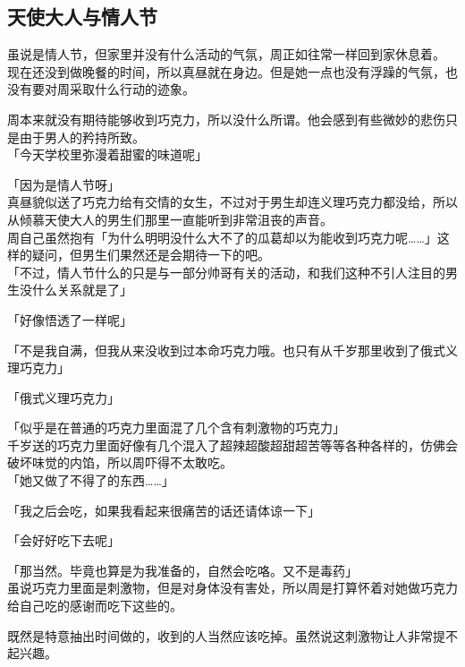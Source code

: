 \subsection{天使大人与情人节}

虽说是情人节，但家里并没有什么活动的气氛，周正如往常一样回到家休息着。\\

现在还没到做晚餐的时间，所以真昼就在身边。但是她一点也没有浮躁的气氛，也没有要对周采取什么行动的迹象。

周本来就没有期待能够收到巧克力，所以没什么所谓。他会感到有些微妙的悲伤只是由于男人的矜持所致。\\

「今天学校里弥漫着甜蜜的味道呢」

「因为是情人节呀」\\

真昼貌似送了巧克力给有交情的女生，不过对于男生却连义理巧克力都没给，所以从倾慕天使大人的男生们那里一直能听到非常沮丧的声音。\\

周自己虽然抱有「为什么明明没什么大不了的瓜葛却以为能收到巧克力呢……」这样的疑问，但男生们果然还是会期待一下的吧。\\

「不过，情人节什么的只是与一部分帅哥有关的活动，和我们这种不引人注目的男生没什么关系就是了」

「好像悟透了一样呢」

「不是我自满，但我从来没收到过本命巧克力哦。也只有从千岁那里收到了俄式义理巧克力」

「俄式义理巧克力」

「似乎是在普通的巧克力里面混了几个含有刺激物的巧克力」\\

千岁送的巧克力里面好像有几个混入了超辣超酸超甜超苦等等各种各样的，仿佛会破坏味觉的内馅，所以周吓得不太敢吃。\\

「她又做了不得了的东西……」

「我之后会吃，如果我看起来很痛苦的话还请体谅一下」

「会好好吃下去呢」

「那当然。毕竟也算是为我准备的，自然会吃咯。又不是毒药」\\

虽说巧克力里面是刺激物，但是对身体没有害处，所以周是打算怀着对她做巧克力给自己吃的感谢而吃下这些的。

既然是特意抽出时间做的，收到的人当然应该吃掉。虽然说这刺激物让人非常提不起兴趣。\\

